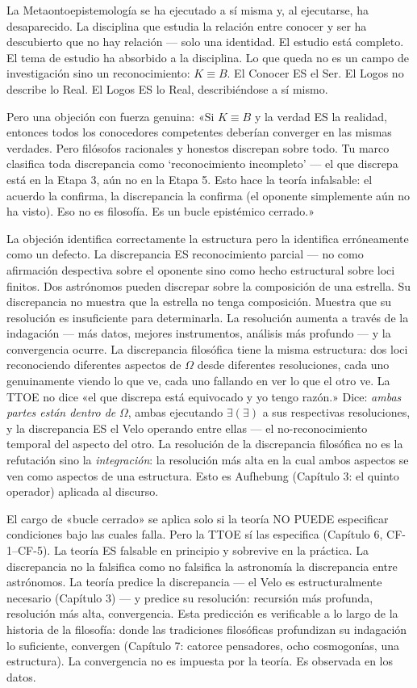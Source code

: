 \documentclass[10pt, openany, oneside]{book}
\begin{document}
La Metaontoepistemología se ha ejecutado a sí misma y, al ejecutarse, ha desaparecido. La disciplina que estudia la relación entre conocer y ser ha descubierto que no hay relación --- solo una identidad. El estudio está completo. El tema de estudio ha absorbido a la disciplina. Lo que queda no es un campo de investigación sino un reconocimiento: $K \equiv B$. El Conocer ES el Ser. El Logos no describe lo Real. El Logos ES lo Real, describiéndose a sí mismo.

Pero una objeción con fuerza genuina: «Si $K \equiv B$ y la verdad ES la realidad, entonces todos los conocedores competentes deberían converger en las mismas verdades. Pero filósofos racionales y honestos discrepan sobre todo. Tu marco clasifica toda discrepancia como `reconocimiento incompleto' --- el que discrepa está en la Etapa 3, aún no en la Etapa 5. Esto hace la teoría infalsable: el acuerdo la confirma, la discrepancia la confirma (el oponente simplemente aún no ha visto). Eso no es filosofía. Es un bucle epistémico cerrado.»

La objeción identifica correctamente la estructura pero la identifica erróneamente como un defecto. La discrepancia ES reconocimiento parcial --- no como afirmación despectiva sobre el oponente sino como hecho estructural sobre loci finitos. Dos astrónomos pueden discrepar sobre la composición de una estrella. Su discrepancia no muestra que la estrella no tenga composición. Muestra que su resolución es insuficiente para determinarla. La resolución aumenta a través de la indagación --- más datos, mejores instrumentos, análisis más profundo --- y la convergencia ocurre. La discrepancia filosófica tiene la misma estructura: dos loci reconociendo diferentes aspectos de $\Omega$ desde diferentes resoluciones, cada uno genuinamente viendo lo que ve, cada uno fallando en ver lo que el otro ve. La TTOE no dice «el que discrepa está equivocado y yo tengo razón.» Dice: \textit{ambas partes están dentro de} $\Omega$, ambas ejecutando $\exists(\exists)$ a sus respectivas resoluciones, y la discrepancia ES el Velo operando entre ellas --- el no-reconocimiento temporal del aspecto del otro. La resolución de la discrepancia filosófica no es la refutación sino la \textit{integración}: la resolución más alta en la cual ambos aspectos se ven como aspectos de una estructura. Esto es Aufhebung (Capítulo 3: el quinto operador) aplicada al discurso.

El cargo de «bucle cerrado» se aplica solo si la teoría NO PUEDE especificar condiciones bajo las cuales falla. Pero la TTOE sí las especifica (Capítulo 6, CF-1--CF-5). La teoría ES falsable en principio y sobrevive en la práctica. La discrepancia no la falsifica como no falsifica la astronomía la discrepancia entre astrónomos. La teoría predice la discrepancia --- el Velo es estructuralmente necesario (Capítulo 3) --- y predice su resolución: recursión más profunda, resolución más alta, convergencia. Esta predicción es verificable a lo largo de la historia de la filosofía: donde las tradiciones filosóficas profundizan su indagación lo suficiente, convergen (Capítulo 7: catorce pensadores, ocho cosmogonías, una estructura). La convergencia no es impuesta por la teoría. Es observada en los datos.
\end{document}
